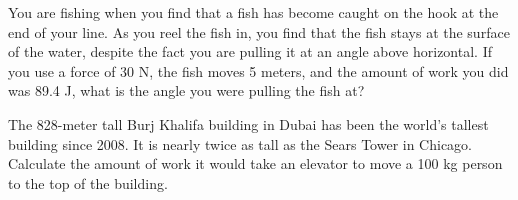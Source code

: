 \documentclass[10pt]{examdesign}
\begin{document}
\pagebreak
\begin{shortanswer} [title={Free Response},
	rearrange=no]
	
	\begin{question}
		You are fishing when you find that a fish has become caught on the hook at the end of your line.  As you reel the fish in, you find that the fish stays at the surface of the water, despite the fact you are pulling it at an angle above horizontal.  If you use a force of 30 N, the fish moves 5 meters, and the amount of work you did was 89.4 J, what is the angle you were pulling the fish at?
		\vspace{2in}
				
	\end{question}


	\begin{question}
		The 828-meter tall Burj Khalifa building in Dubai has been the world's tallest building since 2008.  It is nearly twice as tall as the Sears Tower in Chicago.  Calculate the amount of work it would take an elevator to move a 100 kg person to the top of the building.  
		
	\end{question}
	

	
	\end{shortanswer}
\end{document}
